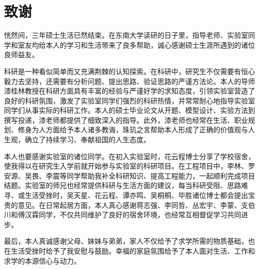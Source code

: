 \chapter{致谢}
恍然间，三年硕士生活已然结束。在东南大学读研的日子里，指导老师、实验室同学和室友均给本人的学习和生活带来了良多帮助，诚心感谢硕士生涯所遇到的诸位良师益友。

科研是一种看似简单而又充满荆棘的认知探索。在科研中，研究生不仅需要有恒心毅力去坚持，还需要有分析问题、提出思路、验证思路的严谨方法论。本人的导师漆桂林教授在科研方面具有丰富的经验与严谨好学的求知态度，引领实验室营造了良好的科研氛围，激发了实验室同学们强烈的科研热情，并常常耐心地指导实验室同学们从事实际的科研工作。本人的硕士毕业论文从开题、模型设计、实验方法到撰写投递，漆老师都提供了细致深入的指导。此外，漆老师也经常在生活、职业规划、修身为人方面给予本人诸多教诲，珠玑之言帮助本人形成了正确的价值观与人生观，确立了持续学习、奉献祖国的人生态度。

本人也要感谢实验室的诸位同学。在初入实验室时，花云程博士分享了学校宿舍，使我得以在研究生入学前就开始参与实验室的科研项目。在工程项目中，李林、罗安源、吴畏、李震等同学帮助我补全科研知识、提高工程能力，一起顺利完成项目结题。实验室的师兄也经常提供科研与生活方面的建议，每当科研受阻、思路难寻、或生活受挫时，吴天星、花云程、谭亦鸣、吴桐桐、毕胜诸位博士都会提出宝贵的意见。在日常起居方面，本人真心感谢蒋志强、李同哲、丛宏宇、李蒙、支伯川和傅汉霖同学，不仅共同维护了良好的宿舍环境，也经常互相督促学习共同进步。

最后，本人真诚感谢父母、妹妹与弟弟，家人不仅给予了求学所需的物质基础，也在生活受挫时给予了我安慰与鼓励。幸福的家庭氛围给予了本人面对生活、工作和求学的本源信心与动力。


























